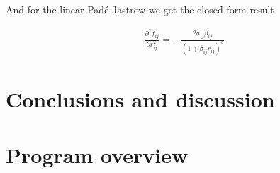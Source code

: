 \documentclass[x11names]{article}
\begin{document}
			And for the linear Padé-Jastrow we get the closed form result

			\begin{align}
				\frac{\partial^{2}f_{ij}}{\partial r_{ij}^{2}}=-\frac{2a_{ij}\beta_{ij}}{\left(1+\beta_{ij}r_{ij}\right)^{3}}
			\end{align}

	



	
	

		


\section{Conclusions and discussion}

	

\appendix

\section{Program overview}
\end{document}
